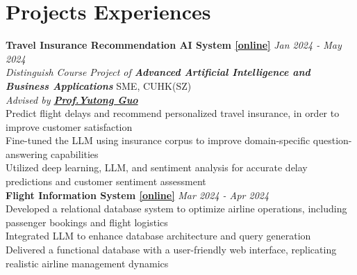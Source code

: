 \documentclass[a4paper,8pt]{article}
\begin{document}
\section*{Projects Experiences}
\textbf{Travel Insurance Recommendation AI System \href{https://tobyyang7.github.io/assets/pdf/Travel_Delay_Insurance_Recommendation_AI_System.pdf}{[online]}} \hfill \textit{Jan 2024 - May 2024}\\
\textit{Distinguish Course Project of \textbf{Advanced Artificial Intelligence and Business Applications}} \hfill SME, CUHK(SZ)\\
\textit{Advised by \textbf{\href{https://myweb.cuhk.edu.cn/guoyutong/Home/Index}{Prof.\@ Yutong Guo}}}\\
\textbullet Predict flight delays and recommend personalized travel insurance, in order to improve customer satisfaction\\
\textbullet Fine-tuned the LLM using insurance corpus to improve domain-specific question-answering capabilities\\
\textbullet Utilized deep learning, LLM, and sentiment analysis for accurate delay predictions and customer sentiment assessment\\
\textbf{Flight Information System \href{https://github.com/TobyYang7/Flight-Information-System}{[online]}} \hfill \textit{Mar 2024 - Apr 2024}\\
\textbullet Developed a relational database system to optimize airline operations, including passenger bookings and flight logistics\\
\textbullet Integrated LLM to enhance database architecture and query generation\\
\textbullet Delivered a functional database with a user-friendly web interface, replicating realistic airline management dynamics\\
\end{document}

